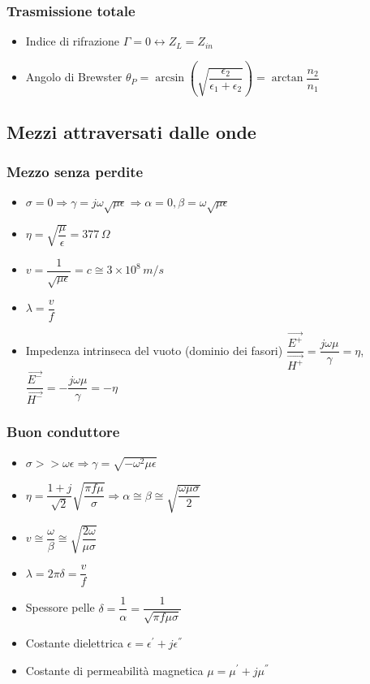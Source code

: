 \documentclass{article}
\begin{document}
\subsubsection{Trasmissione totale}
\begin{itemize}
	\item Indice di rifrazione \( \Gamma = 0 \leftrightarrow Z_L = Z_{in} \)
	\item Angolo di Brewster \( \theta_P = \arcsin\left(\sqrt{\dfrac{\epsilon_2}{\epsilon_1 + \epsilon_2}}\right) = \arctan\dfrac{n_2}{n_1}\)
\end{itemize}

\subsection{Mezzi attraversati dalle onde}
\subsubsection{Mezzo senza perdite}
\begin{itemize}
	\item \( \sigma = 0 \Rightarrow \gamma = j \omega \sqrt{\mu \epsilon} \Rightarrow \alpha = 0, \beta = \omega \sqrt{\mu \epsilon} \) 
	\item \( \eta = \sqrt{\dfrac{\mu}{\epsilon}}  = 377 \, \Omega \)
	\item \( v = \dfrac{1}{\sqrt{\mu \epsilon}} = c \cong 3\times10^8 \, m/s \)
	\item \( \lambda = \dfrac{v}{f} \)
	\item Impedenza intrinseca del vuoto (dominio dei fasori) \( \dfrac{\vec{E^+}}{\vec{H^+}} = \dfrac{j \omega \mu}{\gamma} = \eta \), \(\dfrac{\vec{E^-}}{\vec{H^-}} = - \dfrac{j \omega \mu}{\gamma} = - \eta\) 
\end{itemize}

\subsubsection{Buon conduttore}
\begin{itemize}
	\item \( \sigma >> \omega \epsilon \Rightarrow \gamma = \sqrt{-\omega^2 \mu \epsilon} \)
	\item \( \eta = \dfrac{1+j}{\sqrt{2}} \sqrt{\dfrac{\pi f \mu}{\sigma}} \Rightarrow \alpha \cong \beta
	\cong \sqrt{\dfrac{\omega \mu \sigma}{2}} \)
	\item \( v \cong \dfrac{\omega}{\beta} \cong \sqrt{\dfrac{2 \omega}{\mu \sigma}} \)
	\item \( \lambda = 2 \pi \delta = \dfrac{v}{f} \)
	\item Spessore pelle \( \delta = \dfrac{1}{\alpha} = \dfrac{1}{\sqrt{\pi f \mu \sigma}} \)
	\item Costante dielettrica \( \epsilon = \epsilon ^ { ' } + j \epsilon ^ { '' } \)
	\item Costante di permeabilità magnetica \( \mu = \mu ^ { ' } + j \mu ^ { '' } \)
\end{itemize}
\end{document}
